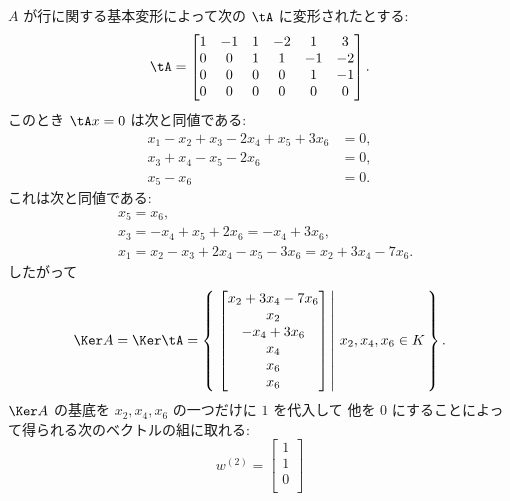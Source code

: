 \documentclass[12pt,twoside]{jarticle}
\begin{document}
\begin{example}
  \label{example:sol-hom-lin-eq}
  $A$ が行に関する基本変形によって次の $\tA$ に変形されたとする:
  \begin{equation*}
    \tA =
    \begin{bmatrix}
      1 & -1 & 1 & -2 &  1 &  3 \\
      0 &  0 & 1 &  1 & -1 & -2 \\
      0 &  0 & 0 &  0 &  1 & -1 \\
      0 &  0 & 0 &  0 &  0 &  0 \\
    \end{bmatrix}.
  \end{equation*}
  このとき $\tA x=0$ は次と同値である:
  \begin{align*}
    x_1 - x_2 + x_3 - 2x_4 +  x_5 + 3x_6 &= 0, \\
                x_3 +  x_4 -  x_5 - 2x_6 &= 0, \\
                              x_5 -  x_6 &= 0.
  \end{align*}
  これは次と同値である:
  \begin{align*}
    & 
    x_5 = x_6,
    \\ &
    x_3 = - x_4 + x_5 + 2x_6 = - x_4 + 3x_6,
    \\ &
    x_1 = x_2 - x_3 + 2x_4 - x_5 - 3x_6 = x_2 + 3x_4 - 7x_6.
  \end{align*}
  したがって
  \begin{equation*}
    \Ker A = \Ker\tA =
    \left\{\,
      \left.
        \begin{bmatrix}
          x_2 + 3x_4 - 7x_6 \\
          x_2               \\
              -  x_4 + 3x_6 \\
                 x_4        \\
                        x_6 \\
                        x_6 \\
        \end{bmatrix}
      \,\right|\,
      x_2,x_4,x_6\in K
    \,\right\}.
  \end{equation*}
  $\Ker A$ の基底を $x_2,x_4,x_6$ の一つだけに $1$ を代入して
  他を $0$ にすることによって得られる次のベクトルの組に取れる:
  \begin{equation*}
    w^{(2)} =
    \begin{bmatrix}
      1 \\
      1 \\
      0 \\

\end{bmatrix}
\end{equation*}
\end{example}
\end{document}
